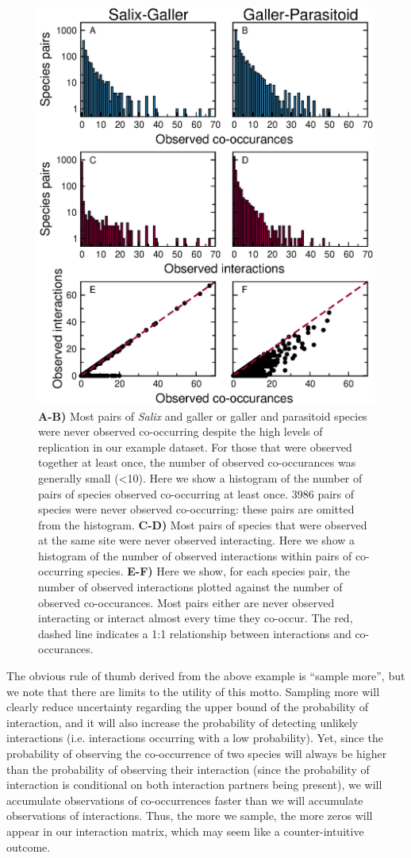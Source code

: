 \documentclass[12pt]{article}
\begin{document}
  \begin{figure}
    \caption{\textbf{A-B)} Most pairs of \emph{Salix} and galler or galler and parasitoid species were never observed co-occurring despite the high levels of replication in our example dataset. For those that were observed together at least once, the number of observed co-occurances was generally small (\textless10). Here we show a histogram of the number of pairs of species observed co-occurring at least once. 3986 pairs of species were never observed co-occurring: these pairs are omitted from the histogram. \textbf{C-D)} Most pairs of species that were observed at the same site were never observed interacting. Here we show a histogram of the number of observed interactions within pairs of co-occurring species. \textbf{E-F)} Here we show, for each species pair, the number of observed interactions plotted against the number of observed co-occurances. Most pairs either are never observed interacting or interact almost every time they co-occur. The red, dashed line indicates a 1:1 relationship between interactions and co-occurances.}
    \label{histograms}
    \includegraphics*[width=.8\textwidth]{figures/Salix_Galler_histogram.eps}
    \end{figure}


  The obvious rule of thumb derived from the above example is “sample more”, but we note that there are limits to the utility of this motto. Sampling more will clearly reduce uncertainty regarding the upper bound of the probability of interaction, and it will also increase the probability of detecting unlikely interactions (i.e. interactions occurring with a low probability). Yet, since the probability of observing the co-occurrence of two species will always be higher than the probability of observing their interaction (since the probability of interaction is conditional on both interaction partners being present), we will accumulate observations of co-occurrences faster than we will accumulate observations of interactions. Thus, the more we sample, the more zeros will appear in our interaction matrix, which may seem like a counter-intuitive outcome.
\end{document}

